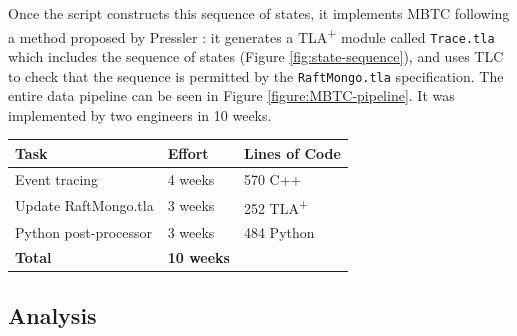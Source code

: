 \documentclass{vldb}
\begin{document}
Once the script constructs this sequence of states, it implements MBTC following a method proposed by Pressler \cite{Pressler18VerifyingSoftwareTracesTLAPlus}: it generates a TLA\textsuperscript{+} module called \texttt{Trace.tla} which includes the sequence of states (Figure \ref{fig:state-sequence}), and uses TLC to check that the sequence is permitted by the \texttt{RaftMongo.tla} specification.
The entire data pipeline can be seen in Figure \ref{figure:MBTC-pipeline}. 
It was implemented by two engineers in 10 weeks.

\begin{center}
\begin{tabular}{ | m{11em} | m{5em}| m{6em} | } 
\hline
Task & Effort & Lines of Code \\  
\hline
Event tracing & 4 weeks & 570 C++ \\ 
Update RaftMongo.tla & 3 weeks & 252 TLA\textsuperscript{+}\\ 
Python post-processor & 3 weeks & 484 Python \\ 
\textbf{Total} & \textbf{10 weeks} & \\
\hline
\end{tabular}
\end{center}

\subsection{Analysis}
\label{subsec:mbtc_analysis}

\end{document}
